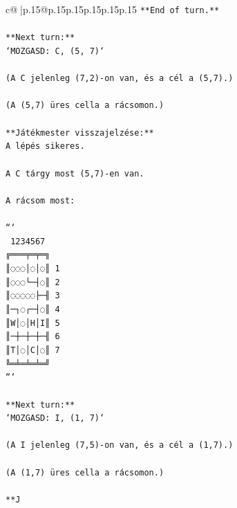 \documentclass{article}
\begin{document}
{\begin{supertabular}{c@{$\;$}|p{.15\linewidth}@{}p{.15\linewidth}p{.15\linewidth}p{.15\linewidth}p{.15\linewidth}p{.15\linewidth}}
{{{\texttt{**End of turn.**  } \\
\\ 
\texttt{**Next turn:**  } \\
\texttt{`MOZGASD: C, (5, 7)`  } \\
\\ 
\texttt{(A C jelenleg (7,2){-}on van, és a cél a (5,7).)  } \\
\\ 
\texttt{(A (5,7) üres cella a rácsomon.)  } \\
\\ 
\texttt{**Játékmester visszajelzése:**  } \\
\texttt{A lépés sikeres.  } \\
\\ 
\texttt{A C tárgy most (5,7){-}en van.  } \\
\\ 
\texttt{A rácsom most:  } \\
\\ 
\texttt{```} \\
\texttt{ 1234567} \\
\texttt{╔═══╤═╤═╗} \\
\texttt{║◌◌◌│◌│◌║ 1} \\
\texttt{║◌◌◌└─┤◌║ 2} \\
\texttt{║◌◌◌◌◌├─╢ 3} \\
\texttt{║─┐◌┌─┤◌║ 4} \\
\texttt{║W│◌│H│I║ 5} \\
\texttt{║─┼─┼─┼─╢ 6} \\
\texttt{║T│◌│C│◌║ 7} \\
\texttt{╚═╧═╧═╧═╝} \\
\texttt{```  } \\
\\ 
\texttt{**Next turn:**  } \\
\texttt{`MOZGASD: I, (1, 7)`  } \\
\\ 
\texttt{(A I jelenleg (7,5){-}on van, és a cél a (1,7).)  } \\
\\ 
\texttt{(A (1,7) üres cella a rácsomon.)  } \\
\\ 
\texttt{**J} \\
            }
        }
    }
     \\ \\


\end{supertabular}}
\end{document}
